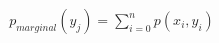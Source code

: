 \documentclass[10pt]{article}
\begin{document}
\begin{align*}p_{marginal} (y_j) = \sum_{i=0}^n p(x_i,y_i)\end{align*}
\end{document}
